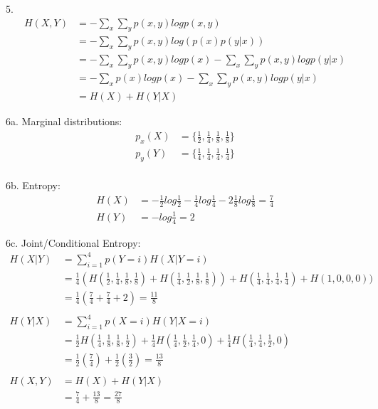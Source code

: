 \documentclass[12pt]{article}
\begin{document}
5.
\begin{align} \nonumber
H(X,Y) &= -\sum_x\sum_yp(x,y)logp(x,y) \\ \nonumber
&= -\sum_x\sum_yp(x,y)log(p(x)p(y|x)) \\ \nonumber
&= -\sum_x\sum_yp(x,y)logp(x) -\sum_x\sum_yp(x,y)logp(y|x) \\ \nonumber
&= -\sum_xp(x)logp(x) -\sum_x\sum_yp(x,y)logp(y|x) \\ \nonumber
&= H(X) + H(Y|X)
\end{align}

6a. Marginal distributions: \\
\begin{align} \nonumber
p_x(X) &= \{\frac{1}{2}, \frac{1}{4}, \frac{1}{8}, \frac{1}{8}\} \\ \nonumber
p_y(Y) &= \{\frac{1}{4}, \frac{1}{4}, \frac{1}{4}, \frac{1}{4}\} \\ \nonumber
\end{align}

6b. Entropy: \\
\begin{align} \nonumber
H(X) &= -\frac{1}{2}log\frac{1}{2} -\frac{1}{4}log\frac{1}{4} -2\frac{1}{8}log\frac{1}{8} = \frac{7}{4} \\ \nonumber
H(Y) &= -log\frac{1}{4} = 2
\end{align}

6c. Joint/Conditional Entropy: \\
\begin{align} \nonumber
H(X|Y) &= \sum_{i=1}^4p(Y=i)H(X|Y=i) \\ \nonumber
&= \frac{1}{4}(H(\frac{1}{2}, \frac{1}{4}, \frac{1}{8}, \frac{1}{8})+H(\frac{1}{4}, \frac{1}{2}, \frac{1}{8}, \frac{1}{8})) + H(\frac{1}{4}, \frac{1}{4}, \frac{1}{4}, \frac{1}{4}) + H(1, 0, 0, 0)) \\ \nonumber
&= \frac{1}{4}(\frac{7}{4}+\frac{7}{4} + 2) = \frac{11}{8} \\ \nonumber \\ \nonumber
H(Y|X) &= \sum_{i=1}^4p(X=i)H(Y|X=i) \\ \nonumber
&= \frac{1}{2}H(\frac{1}{4}, \frac{1}{8}, \frac{1}{8}, \frac{1}{2}) + \frac{1}{4}H(\frac{1}{4}, \frac{1}{2}, \frac{1}{4}, 0) + \frac{1}{4}H(\frac{1}{4}, \frac{1}{4}, \frac{1}{2}, 0) \\ \nonumber
&= \frac{1}{2}(\frac{7}{4}) + \frac{1}{2}(\frac{3}{2}) = \frac{13}{8} \\ \nonumber \\ \nonumber
H(X,Y) &= H(X) + H(Y|X) \\ \nonumber
&= \frac{7}{4} + \frac{13}{8} = \frac{27}{8}
\end{align}
\end{document}
